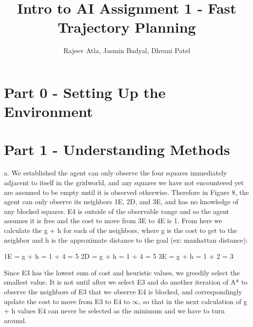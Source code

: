 \documentclass[12pt]{article}
\begin{document}
\title{Intro to AI Assignment 1 - Fast Trajectory Planning}
\author{Rajeev Atla, Jasmin Badyal, Dhvani Patel}
\maketitle



\setcounter{section}{-1}
\section{Part 0 - Setting Up the Environment}


\section{Part 1 - Understanding Methods}

a. We established the agent can only observe the four squares immediately adjacent to itself in the gridworld, and any squares we have not encountered yet are assumed to be empty until it is observed otherwise.
Therefore in Figure 8, the agent can only observe its neighbors 1E, 2D, and 3E, and has no knowledge of any blocked squares. E4 is outside of the observable range and so the agent assumes it is free and the cost to move from 3E to 4E is 1.
From here we calculate the g + h for each of the neighbors, where g is the cost to get to the neighbor and h is the approximate distance to the goal (ex: manhattan distance):

1E = g + h = 1 + 4 = 5
2D = g + h = 1 + 4 = 5
3E = g + h = 1 + 2 = 3

Since E3 has the lowest sum of cost and heuristic values, we greedily select the smallest value. It is not until after we select E3 and do another iteration of A* to observe the neighbors of E3 that we observe E4 is blocked, and correspondingly update the cost to move from E3 to E4 to $\infty$, so that in the next calculation of g + h values E4 can never be selected as the minimum and we have to turn around.

\newline
\end{document}
